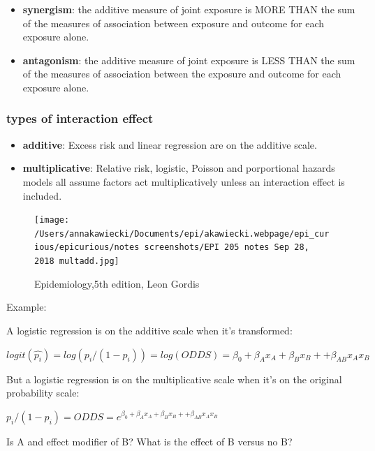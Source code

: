 \documentclass[
]{article}
\begin{document}
\begin{itemize}
\item
  \textbf{synergism}: the additive measure of joint exposure is MORE
  THAN the sum of the measures of association between exposure and
  outcome for each exposure alone.
\item
  \textbf{antagonism}: the additive measure of joint exposure is LESS
  THAN the sum of the measures of association between the exposure and
  outcome for each exposure alone.
\end{itemize}

\hypertarget{types-of-interaction-effect}{%
\subsubsection{types of interaction
effect}\label{types-of-interaction-effect}}

\begin{itemize}
\item
  \textbf{additive}: Excess risk and linear regression are on the
  additive scale.
\item
  \textbf{multiplicative}: Relative risk, logistic, Poisson and
  porportional hazards models all assume factors act multiplicatively
  unless an interaction effect is included.
\end{itemize}

\begin{figure}
\centering
\texttt{[image: /Users/annakawiecki/Documents/epi/akawiecki.webpage/epi\_curious/epicurious/notes screenshots/EPI 205 notes Sep 28, 2018 multadd.jpg]}
\caption{Epidemiology,5th edition, Leon Gordis}
\end{figure}

Example:

A logistic regression is on the additive scale when it's transformed:

\(logit(\hat{p_i}) = log(p_i/(1-p_i)) = log(ODDS) =\beta_0 +\beta_A x_A + \beta_B x_B + +\beta_{AB} x_A x_B\)

But a logistic regression is on the multiplicative scale when it's on
the original probability scale:

\(p_i/(1-p_i) = ODDS =e^{\beta_0 +\beta_A x_A + \beta_B x_B + +\beta_{AB} x_A x_B}\)

Is A and effect modifier of B? What is the effect of B versus no B?
\end{document}
